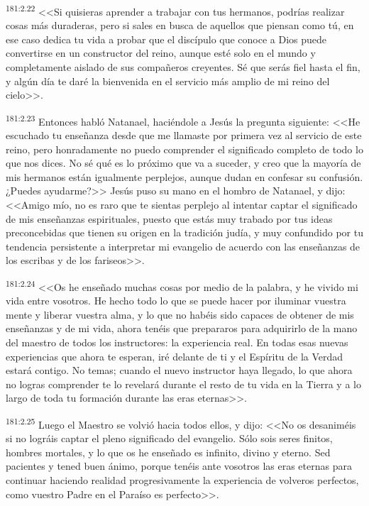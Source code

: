 \par 
\textsuperscript{181:2.22} <<Si quisieras aprender a trabajar con tus hermanos, podrías realizar cosas más duraderas, pero si sales en busca de aquellos que piensan como tú, en ese caso dedica tu vida a probar que el discípulo que conoce a Dios puede convertirse en un constructor del reino, aunque esté solo en el mundo y completamente aislado de sus compañeros creyentes. Sé que serás fiel hasta el fin, y algún día te daré la bienvenida en el servicio más amplio de mi reino del cielo>>.

\par 
\textsuperscript{181:2.23} Entonces habló Natanael, haciéndole a Jesús la pregunta siguiente: <<He escuchado tu enseñanza desde que me llamaste por primera vez al servicio de este reino, pero honradamente no puedo comprender el significado completo de todo lo que nos dices. No sé qué es lo próximo que va a suceder, y creo que la mayoría de mis hermanos están igualmente perplejos, aunque dudan en confesar su confusión. ¿Puedes ayudarme?>> Jesús puso su mano en el hombro de Natanael, y dijo: <<Amigo mío, no es raro que te sientas perplejo al intentar captar el significado de mis enseñanzas espirituales, puesto que estás muy trabado por tus ideas preconcebidas que tienen su origen en la tradición judía, y muy confundido por tu tendencia persistente a interpretar mi evangelio de acuerdo con las enseñanzas de los escribas y de los fariseos>>.

\par 
\textsuperscript{181:2.24} <<Os he enseñado muchas cosas por medio de la palabra, y he vivido mi vida entre vosotros. He hecho todo lo que se puede hacer por iluminar vuestra mente y liberar vuestra alma, y lo que no habéis sido capaces de obtener de mis enseñanzas y de mi vida, ahora tenéis que prepararos para adquirirlo de la mano del maestro de todos los instructores: la experiencia real. En todas esas nuevas experiencias que ahora te esperan, iré delante de ti y el Espíritu de la Verdad estará contigo. No temas; cuando el nuevo instructor haya llegado, lo que ahora no logras comprender te lo revelará durante el resto de tu vida en la Tierra y a lo largo de toda tu formación durante las eras eternas>>.

\par 
\textsuperscript{181:2.25} Luego el Maestro se volvió hacia todos ellos, y dijo: <<No os desaniméis si no lográis captar el pleno significado del evangelio. Sólo sois seres finitos, hombres mortales, y lo que os he enseñado es infinito, divino y eterno. Sed pacientes y tened buen ánimo, porque tenéis ante vosotros las eras eternas para continuar haciendo realidad progresivamente la experiencia de volveros perfectos, como vuestro Padre en el Paraíso es perfecto>>.

